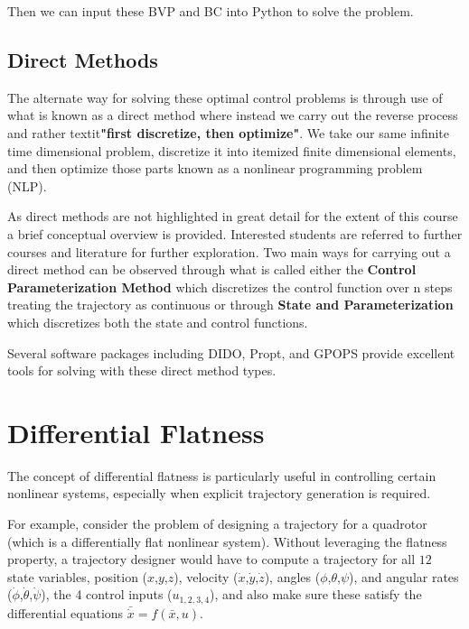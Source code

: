 \documentclass[twoside]{article}
\begin{document}
Then we can input these BVP and BC into Python to solve the problem.


\subsection{Direct Methods}
The alternate way for solving these optimal control problems is through use of what is known as a direct method where instead we carry out the reverse process and rather textit{\textbf{"first discretize, then optimize"}}. We take our same infinite time dimensional problem, discretize it into itemized finite dimensional elements, and then optimize those parts known as a nonlinear programming problem (NLP).

As direct methods are not highlighted in great detail for the extent of this course a brief conceptual overview is provided. Interested students are referred to further courses and literature for further exploration. Two main ways for carrying out a direct method can be observed through what is called either the \textbf{Control Parameterization Method} which discretizes the control function over n steps treating the trajectory as continuous or through \textbf{State and Parameterization} which discretizes both the state and control functions.

Several software packages including DIDO, Propt, and GPOPS provide excellent tools for solving with these direct method types.

\section{Differential Flatness}
The concept of differential flatness is particularly useful in controlling certain nonlinear systems, especially when explicit trajectory generation is required.

For example, consider the problem of designing a trajectory for a quadrotor (which is a differentially flat nonlinear system). Without leveraging the flatness property, a trajectory designer would have to compute a trajectory for all $12$ state variables, position ($x$,$y$,$z$), velocity ($\dot{x}$,$\dot{y}$,$\dot{z}$), angles ($\phi$,$\theta$,$\psi$), and angular rates ($\dot{\phi}$,$\dot{\theta}$,$\dot{\psi}$), the 4 control inputs ($u_{1,2,3,4}$), and also make sure these satisfy the differential equations $\bar{\dot{x}} = f(\bar{x},u)$.
\end{document}
